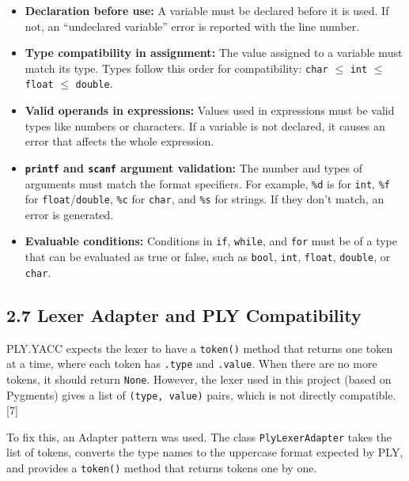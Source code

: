 \documentclass[letterpaper,12pt,oneside]{article}
\begin{document}
\begin{itemize}
\item \textbf{Declaration before use:} A variable must be declared before it is used. If not, an “undeclared variable” error is reported with the line number.

\item \textbf{Type compatibility in assignment:} The value assigned to a variable must match its type. Types follow this order for compatibility: \texttt{char} $\le$ \texttt{int} $\le$ \texttt{float} $\le$ \texttt{double}.

\item \textbf{Valid operands in expressions:} Values used in expressions must be valid types like numbers or characters. If a variable is not declared, it causes an error that affects the whole expression.

\item \textbf{\texttt{printf} and \texttt{scanf} argument validation:} The number and types of arguments must match the format specifiers. For example, \texttt{\%d} is for \texttt{int}, \texttt{\%f} for \texttt{float}/\texttt{double}, \texttt{\%c} for \texttt{char}, and \texttt{\%s} for strings. If they don’t match, an error is generated.

\item \textbf{Evaluable conditions:} Conditions in \texttt{if}, \texttt{while}, and \texttt{for} must be of a type that can be evaluated as true or false, such as \texttt{bool}, \texttt{int}, \texttt{float}, \texttt{double}, or \texttt{char}.

\end{itemize}

\subsection*{2.7 Lexer Adapter and PLY Compatibility}

PLY.YACC expects the lexer to have a \texttt{token()} method that returns one token at a time, where each token has \texttt{.type} and \texttt{.value}. When there are no more tokens, it should return \texttt{None}. However, the lexer used in this project (based on Pygments) gives a list of \texttt{(type, value)} pairs, which is not directly compatible.[7]

To fix this, an Adapter pattern was used. The class \texttt{PlyLexerAdapter} takes the list of tokens, converts the type names to the uppercase format expected by PLY, and provides a \texttt{token()} method that returns tokens one by one.
\end{document}
